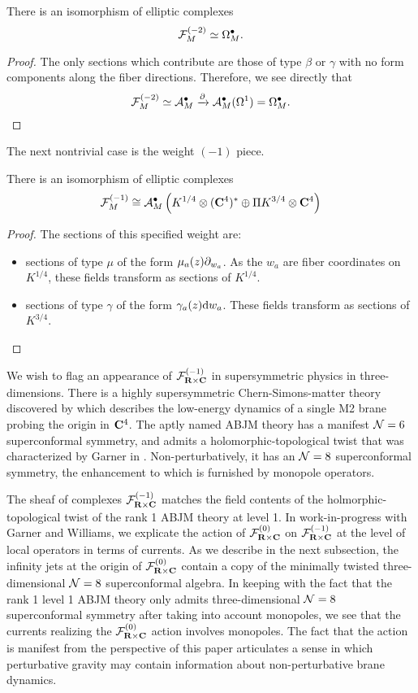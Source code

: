 \documentclass[../main.tex]{subfiles}
\begin{document}
\begin{lem}
There is an isomorphism of elliptic complexes \[\mathcal{F}^{(-2)}_{M} \simeq \Omega^\bullet_{M}.\]
\end{lem}
\begin{proof}
The only sections which contribute are those of type $\beta$ or $\gamma$ with no form components along the fiber directions. Therefore, we see directly that \[\mathcal{F}^{(-2)}_{M} \simeq \mathcal A^\bullet_M \xrightarrow{\partial} \mathcal A^\bullet_M(\Omega^1) = \Omega^\bullet_M.\] 
\end{proof}

\parsec[] The next nontrivial case is the weight ${(-1)}$ piece. 

\begin{lem}
There is an isomorphism of elliptic complexes 
\[ \mathcal{F}^{(-1)}_{M} \cong \mathcal A^\bullet_M \left (K^{1/4}\otimes (\mathbf{C}^4)^* \oplus \Pi K^{3/4}\otimes \mathbf{C}^4 \right ) \]
\end{lem}
\begin{proof}
The sections of this specified weight are:
\begin{itemize}
\item sections of type $\mu$ of the form $\mu_a(z) \partial_{w_a}$. 
As the $w_a$ are fiber coordinates on $K^{1/4}$, these fields transform as sections of $K^{1/4}$.
\item sections of type $\gamma$ of the form $\gamma_a(z) \mathrm{d} w_a$. 
These fields transform as sections of $K^{3/4}$. 
\end{itemize}
\end{proof}

\parsec[]
We wish to flag an appearance of $\mathcal{F}^{(-1)}_{\mathbf{R}\times \mathbf{C}}$ in supersymmetric physics in three-dimensions. There is a highly supersymmetric Chern-Simons-matter theory discovered by \cite{} which describes the low-energy dynamics of a single M2 brane probing the origin in $\mathbf{C}^4$. The aptly named ABJM theory has a manifest $\mathcal{N}=6$ superconformal symmetry, and admits a holomorphic-topological twist that was characterized by Garner in \cite{Garner2022vds}. Non-perturbatively, it has an $\mathcal{N}=8$ superconformal symmetry, the enhancement to which is furnished by monopole operators. 

The sheaf of complexes $\mathcal{F}^{(-1)}_{\mathbf{R}\times \mathbf{C}}$ matches the field contents of the holmorphic-topological twist of the rank 1 ABJM theory at level 1. In work-in-progress with Garner and Williams, we explicate the action of $\mathcal{F}^{(0)}_{\mathbf{R}\times \mathbf{C}}$ on $\mathcal{F}^{(-1)}_{\mathbf{R}\times \mathbf{C}}$ at the level of local operators in terms of currents. As we describe in the next subsection, the infinity jets at the origin of $\mathcal{F}^{(0)}_{\mathbf{R}\times \mathbf{C}}$ contain a copy of the minimally twisted three-dimensional $\mathcal{N}=8$ superconformal algebra. In keeping with the fact that the rank 1 level 1 ABJM theory only admits three-dimensional $\mathcal{N}=8$ superconformal symmetry after taking into account monopoles, we see that the currents realizing the $\mathcal{F}^{(0)}_{\mathbf{R}\times \mathbf{C}}$ action involves monopoles. The fact that the action is manifest from the perspective of this paper articulates a sense in which perturbative gravity may contain information about non-perturbative brane dynamics.
\end{document}

